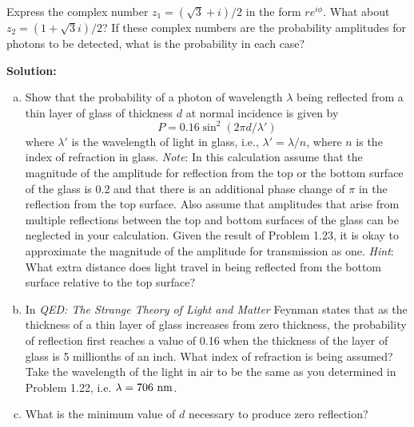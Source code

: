 \documentclass[11pt]{article}
\newcommand{\be}{\begin{enumerate}[a) ]}
\newcommand{\ee}{\end{enumerate}}
\begin{document}
\vspace*{0.25in}



\begin{problem}[Townsend (P1.19)]
Express the complex number $z_1 = (\sqrt{3} + i)/2$ in the form $re^{i\phi}$. What about 
$z_2 = (1 + \sqrt{3}i)/2$? If these complex numbers are the probability amplitudes for photons to be detected, what is the
probability in each case?
\end{problem}


\textbf{Solution:}\\

\clearpage

\begin{problem}[Townsend (P1.24)]
\be
\item Show that the probability of a photon of wavelength $\lambda$ being reflected from a thin layer of
glass of thickness $d$ at normal incidence is given by
\[	
	P = 0.16 \sin^2(2\pi d/\lambda')
\]
where $\lambda'$ is the wavelength of light in glass, i.e., 
$\lambda' = \lambda/n$, where $n$ is the index of refraction
in glass. \textit{Note}: In this calculation assume that the magnitude of the amplitude for reflection
from the top or the bottom surface of the glass is 0.2 and that there is an additional phase
change of $\pi$ in the reflection from the top surface. Also assume that amplitudes that arise
from multiple reflections between the top and bottom surfaces of the glass can be neglected in
your calculation. Given the result of Problem 1.23, it is okay to approximate the magnitude
of the amplitude for transmission as one. \textit{Hint}: What extra distance does light travel in being
reflected from the bottom surface relative to the top surface?
\item In \textit{QED: The Strange Theory of Light and Matter} Feynman states that as the thickness of a
thin layer of glass increases from zero thickness, the probability of reflection first reaches a
value of 0.16 when the thickness of the layer of glass is 5 millionths of an inch. What index
of refraction is being assumed? Take the wavelength of the light in air to be the same as you
determined in Problem 1.22, i.e. $\lambda = 706~\mathrm{nm}$.
\item What is the minimum value of $d$ necessary to produce zero reflection?
\ee
\end{problem}
\end{document}
